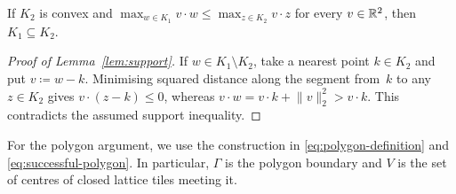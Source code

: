 \documentclass[11pt,letterpaper]{article}
\begin{document}
\begin{lemma}
\label{lem:support}
If $K_2$ is convex and $\max_{w\in K_1}v\cdot w\le\max_{z\in K_2}v\cdot z$ for every $v\in\mathbb R^2$, then $K_1\subseteq K_2$.
\end{lemma}

\begin{proof}[Proof of Lemma~\ref{lem:support}]
If $w\in K_1\setminus K_2$, take a nearest point $k\in K_2$ and put $v\coloneqq w-k$. Minimising squared distance along the segment from~$k$ to any $z\in K_2$ gives $v\cdot(z-k)\le0$, whereas $v\cdot w=v\cdot k+\lVert v\rVert_2^2>v\cdot k$. This contradicts the assumed support inequality.
\end{proof}

For the polygon argument, we use the construction in \eqref{eq:polygon-definition} and \eqref{eq:successful-polygon}. In particular, $\Gamma$ is the polygon boundary and $V$ is the set of centres of closed lattice tiles meeting it.
\end{document}
